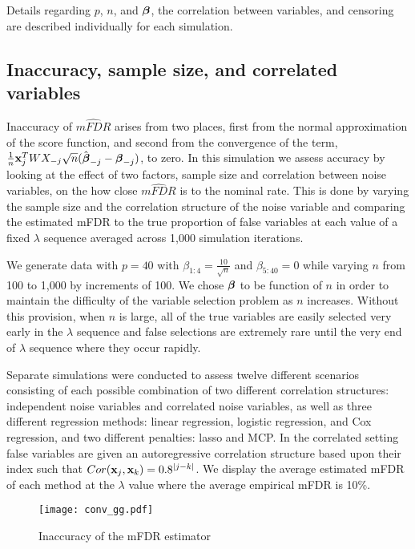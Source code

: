 Details regarding $p$, $n$, and $\boldsymbol{\beta}$, the correlation between variables, and censoring are described individually for each simulation.

\subsection{Inaccuracy, sample size, and correlated variables}

Inaccuracy of $\widehat{mFDR}$ arises from two places, first from the normal approximation of the score function, and second from the convergence of the term, $\frac{1}{n}\mathbf{x}_j^T W X_{-j}\sqrt{n}(\hat{\boldsymbol{\beta}}_{-j} -  \boldsymbol{\beta}_{-j})$, to zero. In this simulation we assess accuracy by looking at the effect of two factors, sample size and correlation between noise variables, on the how close $\widehat{mFDR}$ is to the nominal rate. This is done by varying the sample size and the correlation structure of the noise variable and comparing the estimated mFDR to the true proportion of false variables at each value of a fixed $\lambda$ sequence averaged across 1,000 simulation iterations.

We generate data with $p = 40$ with $\beta_{1:4} = \frac{10}{\sqrt{n}}$ and $\beta_{5:40} = 0$ while varying $n$ from 100 to 1,000 by increments of 100.  We chose $\boldsymbol{\beta}$ to be function of $n$ in order to maintain the difficulty of the variable selection problem as $n$ increases.  Without this provision, when $n$ is large, all of the true variables are easily selected very early in the $\lambda$ sequence and false selections are extremely rare until the very end of $\lambda$ sequence where they occur rapidly.

Separate simulations were conducted to assess twelve different scenarios consisting of each possible combination of two different correlation structures: independent noise variables and correlated noise variables, as well as three different regression methods: linear regression, logistic regression, and Cox regression, and two different penalties: lasso and MCP. In the correlated setting false variables are given an autoregressive correlation structure based upon their index such that $Cor(\mathbf{x}_j,\mathbf{x}_k) = 0.8^{|j - k|}$. We display the average estimated mFDR of each method at the $\lambda$ value where the average empirical mFDR is 10\%.

\begin{figure} [!htb]
 \centering
  \texttt{[image: conv\_gg.pdf]}
  \caption{Inaccuracy of the mFDR estimator }
\end{figure}

